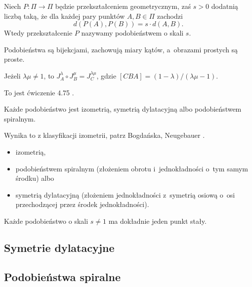 
\begin{definition}[podobieństwo]
    Niech $P \colon \Pi \to \Pi$ będzie przekształceniem geometrycznym, zaś $s > 0$ dodatnią liczbą taką, że dla każdej pary punktów $A, B \in \Pi$ zachodzi
    \begin{equation}
        d(P(A), P(B)) = s \cdot d(A, B).
    \end{equation}
    Wtedy przekształcenie $P$ nazywamy podobieństwem o skali $s$.
\end{definition}

Podobieństwa są bijekcjami, zachowują miary kątów, a~obrazami prostych są proste.

\begin{proposition}
    Jeżeli $\lambda \mu \neq 1$, to $J_A^\lambda \circ J_B^\mu = J_C^{\lambda \mu}$, gdzie $[CBA] = (1-\lambda) / (\lambda \mu - 1)$.
\end{proposition}

To jest ćwiczenie 4.75 \cite[s. 217]{neugebauer_2018}.

\begin{proposition}
    Każde podobieństwo jest izometrią, symetrią dylatacyjną albo podobieństwem spiralnym.
\end{proposition}

Wynika to z klasyfikacji izometrii, patrz Bogdańska, Neugebauer \cite[s. 220]{neugebauer_2018}.

\begin{itemize}
        \item izometrią,
        \item podobieństwem spiralnym (złożeniem obrotu i~jednokładności o~tym samym środku) albo
        \item symetrią dylatacyjną (złożeniem jednokładności z~symetrią osiową o~osi przechodzącej przez środek jednokładności).
    \end{itemize}

\begin{proposition}
    Każde podobieństwo o skali $s \neq 1$ ma dokładnie jeden punkt stały.
\end{proposition}

\subsection{Symetrie dylatacyjne}

\subsection{Podobieństwa spiralne}